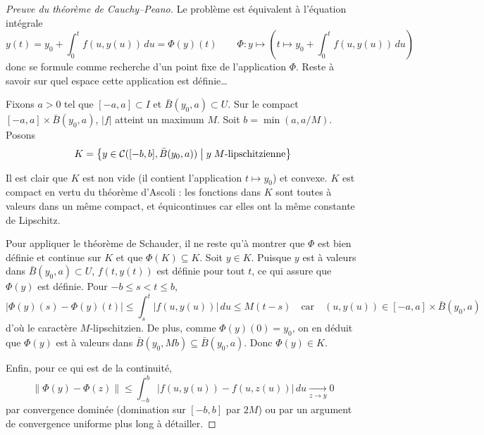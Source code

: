\documentclass[a4paper, 11pt]{article}
\def\Cf{{\cal{C}}}
\begin{document}
\begin{proof}[Preuve du théorème de Cauchy--Peano]
  Le problème est équivalent à l'équation intégrale
  \[ y(t) = y_0 + \int_0^t f(u,y(u))\,du = \Phi(y)(t) \qquad
    \Phi : y \mapsto \left( t \mapsto y_0 + \int_0^t f(u,y(u))\,du \right) \]
  donc se formule comme recherche d'un point fixe de l'application $\Phi$. Reste
  à savoir sur quel espace cette application est définie…

  Fixons $a > 0$ tel que $[-a,a] \subset I$ et $\bar{B}(y_0,a) \subset U$. Sur
  le compact $[-a,a] \times \bar{B}(y_0,a)$, $|f|$ atteint un maximum $M$. Soit
  $b = \min(a,a/M)$. Posons
  \[ K = \left\{ y \in \Cf([-b,b], \bar{B}(y_0,a)) \; \middle| \; y \;
      \text{$M$-lipschitzienne} \right\}\]

  Il est clair que $K$ est non vide (il contient l'application $t \mapsto y_0$)
  et convexe. $K$ est compact en vertu du théorème d'Ascoli : les fonctions dans
  $K$ sont toutes à valeurs dans un même compact, et équicontinues car elles ont
  la même constante de Lipschitz.

  Pour appliquer le théorème de Schauder, il ne reste qu'à montrer que $\Phi$
  est bien définie et continue sur $K$ et que $\Phi(K) \subseteq K$. Soit $y \in
  K$. Puisque $y$ est à valeurs dans $\bar{B}(y_0,a) \subset U$, $f(t,y(t))$ est
  définie pour tout $t$, ce qui assure que $\Phi(y)$ est définie. Pour $-b \leq
  s < t \leq b$,
  \[ |\Phi(y)(s) - \Phi(y)(t)| \leq \int_s^t |f(u,y(u))|\,du \leq M(t-s)
    \quad \text{car} \quad (u,y(u)) \in [-a,a] \times \bar{B}(y_0,a)
  \]
  d'où le caractère $M$-lipschitzien. De plus, comme $\Phi(y)(0) = y_0$, on en
  déduit que $\Phi(y)$ est à valeurs dans $\bar{B}(y_0,Mb) \subseteq
  \bar{B}(y_0,a)$. Donc $\Phi(y) \in K$.

  Enfin, pour ce qui est de la continuité,
  \[ \|\Phi(y) - \Phi(z)\| \leq \int_{-b}^b |f(u,y(u)) - f(u,z(u))|\,du
    \xrightarrow[z \to y]{} 0
  \]
  par convergence dominée (domination sur $[-b,b]$ par $2M$) ou par un argument
  de convergence uniforme plus long à détailler.
\end{proof}
\end{document}
